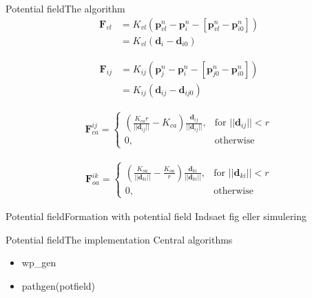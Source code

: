\documentclass[10pt,handout]{beamer}
\begin{document}
\begin{frame}{Potential field}{The algorithm}
\begin{align}
\mathbf{F}_{vl} &= K_{vl}(\mathbf{p}_{vl}^n-\mathbf{p}_i^n-[\mathbf{p}_{vl}^n-\mathbf{p}_{i0}^n])\\
&= K_{vl}(\mathbf{d}_i-\mathbf{d}_{i0})
\end{align}

\begin{align}
\mathbf{F}_{ij} &= K_{ij}(\mathbf{p}_{j}^n-\mathbf{p}_i^n-[\mathbf{p}_{j0}^n-\mathbf{p}_{i0}^n])\\
&= K_{ij}(\mathbf{d}_{ij}-\mathbf{d}_{ij0})
\end{align}

\begin{align}
    \mathbf{F}_{ca}^{ij}= 
\begin{cases}
    \left(
    \frac{K_{ca}r}{||\mathbf{d}_{ij}||}-K_{ca}
    \right)
    \frac{\mathbf{d}_{ij}}{||\mathbf{d}_{ij}||}
    ,& \text{for } ||\mathbf{d}_{ij}||<r\\
    0,              & \text{otherwise}
\end{cases}
\end{align}

\begin{align}
    \mathbf{F}_{oa}^{ik}= 
\begin{cases}
    \left( \frac{K_{oa}}{||\mathbf{d}_{ki}||}-\frac{K_{oa}}{r}\right)
    \frac{\mathbf{d}_{{ki}}}{||\mathbf{d}_{ki}||},& \text{for } ||\mathbf{d}_{ki}||<r\\
    0,              & \text{otherwise}
\end{cases}
\end{align}
\end{frame}

\begin{frame}{Potential field}{Formation with potential field}
Indsaet fig eller simulering
\end{frame}

\begin{frame}{Potential field}{The implementation}
Central algorithms
\begin{itemize}
\item wp\_gen
\item pathgen(potfield)
\end{itemize}
\end{frame}
\end{document}
